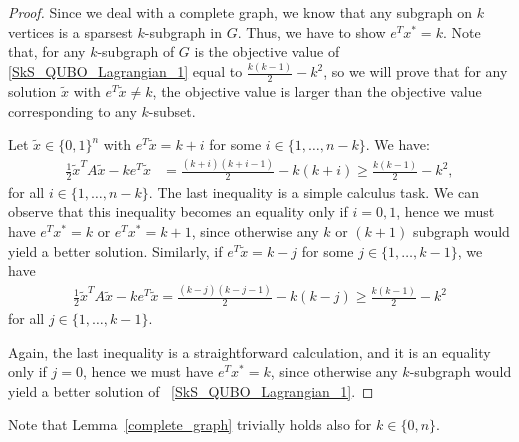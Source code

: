 \documentclass{article}
\begin{document}
\begin{proof}
Since we deal with a complete graph, we know that any subgraph on $k$ vertices is a sparsest $k$-subgraph in $G$. 
Thus, we have to show $e^Tx^*=k$. 
Note that, for any $k$-subgraph of $G$ is the  objective value of
\eqref{SkS_QUBO_Lagrangian_1} equal to 
$\frac{k(k-1)}{2} - k^2$, so we will prove that for any solution $\tilde x$ with $e^T\tilde x\neq k$, the objective value is larger than the objective value corresponding to any $k$-subset.

Let $\tilde{x} \in \{0, 1\}^n$ with $e^T\tilde{x} = k + i$ for some $i \in \{1, \ldots, n - k\}$. We have:
\begin{align}\label{eq:ineq1}
\frac{1}{2}\tilde x^{T} A \tilde x - k e^T\tilde x &=  \frac{(k+i)(k + i - 1)}{2} - k(k+i) \ge  
\frac{k(k-1)}{2} - k^2,
\end{align}
for all $i \in \{1, \ldots, n - k\}$. The last inequality is a simple calculus task. We can observe that this inequality becomes an equality only if $i=0,1$, hence we must have  $e^T x^*=k$ or $e^T x^*=k+1$, since otherwise any $k$ or $(k+1)$ subgraph would yield a better solution.
Similarly, if  $e^T\tilde x = k - j$ for some $j \in \{1, \ldots, k - 1\}$, we have 
\begin{align*}
\frac{1}{2}\tilde x^{T} A \tilde x - k e^T\tilde x =
 \frac{(k - j)(k - j - 1)}{2} - k(k - j) \ge \frac{k(k-1)}{2} - k^2
\end{align*}
for all $j \in \{1, \ldots, k - 1\}$.

Again, the last inequality is a straightforward calculation, and it is an equality only if $j=0$, hence we must have $e^T x^*=k$, since otherwise any $k$-subgraph would yield a better solution of ~\eqref{SkS_QUBO_Lagrangian_1}.

\end{proof}
Note that Lemma~\ref{complete_graph} trivially holds also for $k\in \{0,n\}$. 
\end{document}

